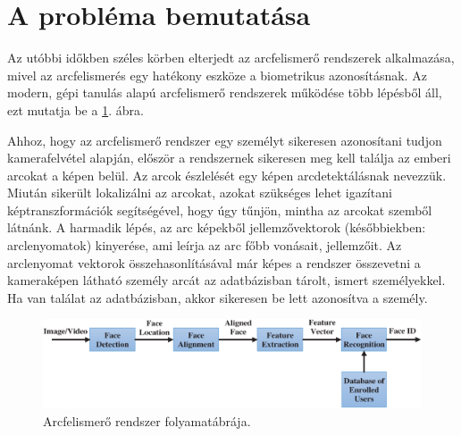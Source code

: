 
\section{A probléma bemutatása}





Az utóbbi időkben széles körben elterjedt az arcfelismerő rendszerek alkalmazása, mivel az arcfelismerés egy hatékony eszköze a biometrikus azonosításnak. Az modern, gépi tanulás alapú arcfelismerő rendszerek működése több lépésből áll, ezt mutatja be a \ref{fig:fr}. ábra. 

Ahhoz, hogy az arcfelismerő rendszer egy személyt sikeresen azonosítani tudjon kamerafelvétel alapján, először a rendszernek sikeresen meg kell találja az emberi arcokat a képen belül. Az arcok észlelését egy képen arcdetektálásnak nevezzük. Miután sikerült lokalizálni az arcokat, azokat szükséges lehet igazítani képtranszformációk segítségével, hogy úgy tűnjön, mintha az arcokat szemből látnánk. A harmadik lépés, az arc képekből jellemzővektorok (későbbiekben: arclenyomatok) kinyerése, ami leírja az arc főbb vonásait, jellemzőit. Az arclenyomat vektorok összehasonlításával már képes a rendszer összevetni a kameraképen látható személy arcát az adatbázisban tárolt, ismert személyekkel. Ha van találat az adatbázisban, akkor sikeresen be lett azonosítva a személy. \cite{hassan2021face}

\begin{figure}[h]
	\centering
	\includegraphics[width=1\columnwidth]{figures/facerecognition.png}
	\caption{Arcfelismerő rendszer folyamatábrája. \cite{hassan2021face}}
	\label{fig:fr}
\end{figure}

